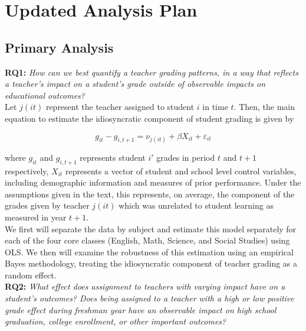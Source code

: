 \documentclass{article}
\begin{document}
\section*{Updated Analysis Plan}

\subsection*{Primary Analysis}

\textbf{RQ1:} \textit{How can we best quantify a teacher grading patterns, in a way that reflects a teacher’s impact on a student’s grade outside of observable impacts on educational outcomes?} \\

Let $j(it)$ represent the teacher assigned to student $i$ in time $t$. Then, the main equation to estimate the idiosyncratic component of student grading is given by

\begin{equation}
	g_{it} - g_{i,t+1} = \nu_{j(it)} + \beta X_{it} + \varepsilon_{it}
\end{equation}

where $g_{it}$ and $g_{i,t+1}$ represents student $i'$ grades in period $t$ and $t+1$ respectively, $X_{it}$ represents a vector of student and school level control variables, including demographic information and measures of prior performance. Under the assumptions given in the text, this represents, on average, the component of the grades given by teacher $j(it)$ which was unrelated to student learning as measured in year $t+1$. \\

We first will separate the data by subject and estimate this model separately for each of the four core classes (English, Math, Science, and Social Studies) using OLS. We then will examine the robustness of this estimation using an empirical Bayes methodology, treating the idiosyncratic component of teacher grading as a random effect. \\

\textbf{RQ2:} \textit{What effect does assignment to teachers with varying impact have on a student’s outcomes? Does being assigned to a teacher with a high or low positive grade effect during freshman year have an observable impact on high school graduation, college enrollment, or other important outcomes? } \\
\end{document}
